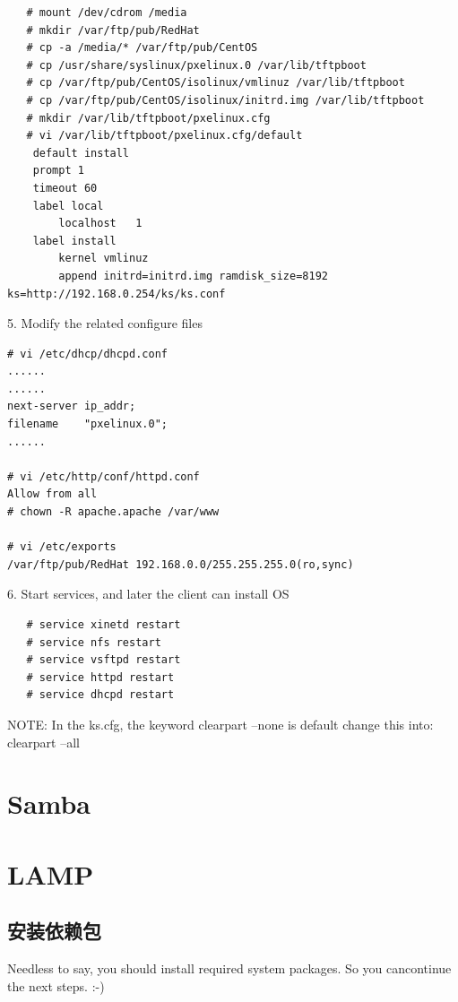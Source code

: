 \small{
\begin{verbatim}
   # mount /dev/cdrom /media
   # mkdir /var/ftp/pub/RedHat
   # cp -a /media/* /var/ftp/pub/CentOS
   # cp /usr/share/syslinux/pxelinux.0 /var/lib/tftpboot
   # cp /var/ftp/pub/CentOS/isolinux/vmlinuz /var/lib/tftpboot
   # cp /var/ftp/pub/CentOS/isolinux/initrd.img /var/lib/tftpboot
   # mkdir /var/lib/tftpboot/pxelinux.cfg
   # vi /var/lib/tftpboot/pxelinux.cfg/default
	default install
	prompt 1
	timeout 60
	label local
		localhost	1
	label install
		kernel vmlinuz
		append initrd=initrd.img ramdisk_size=8192 ks=http://192.168.0.254/ks/ks.conf
\end{verbatim}
}
\normalsize

5. Modify the related configure files

\small{
\begin{verbatim}
# vi /etc/dhcp/dhcpd.conf
......
......
next-server	ip_addr;
filename	"pxelinux.0";
......

# vi /etc/http/conf/httpd.conf
Allow from all
# chown -R apache.apache /var/www

# vi /etc/exports
/var/ftp/pub/RedHat 192.168.0.0/255.255.255.0(ro,sync)
\end{verbatim}
}
\normalsize

6. Start services, and later the client can install OS

\small{
\begin{verbatim}
   # service xinetd restart
   # service nfs restart
   # service vsftpd restart
   # service httpd restart
   # service dhcpd restart
\end{verbatim}
}
\normalsize

NOTE:
In the ks.cfg, the keyword 
clearpart --none is default
change this into:
clearpart --all

\chapter{Samba}

\chapter{LAMP}

\section{安装依赖包}

Needless to say, you should install required system packages. So you
cancontinue the next steps. :-)

